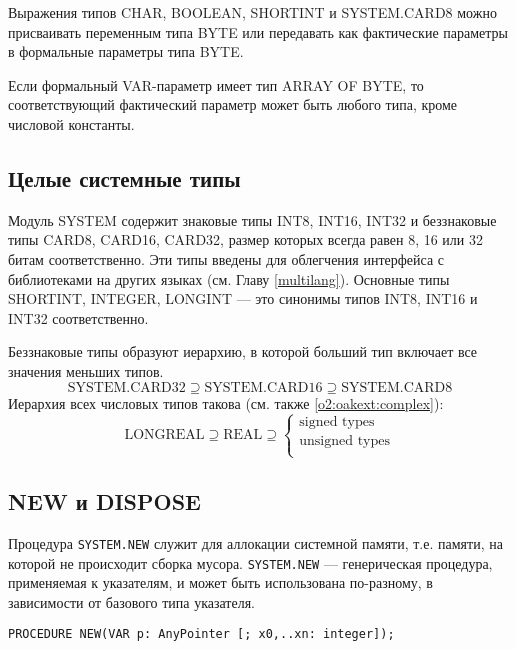 Выражения типов CHAR, BOOLEAN, SHORTINT и SYSTEM.CARD8 
можно присваивать переменным типа
BYTE или передавать как фактические параметры в формальные параметры типа
BYTE.

Если формальный VAR-параметр имеет тип ARRAY OF BYTE,
то соответствующий фактический параметр может быть любого типа,
кроме числовой константы.

\subsection{Целые системные типы}\label{o2:fixed:size}

Модуль SYSTEM содержит знаковые типы
INT8, INT16, INT32
и беззнаковые типы CARD8, CARD16, CARD32,
размер которых всегда равен
8, 16 или 32 битам соответственно. Эти типы введены для 
облегчения интерфейса с библиотеками на других языках
(см. Главу \ref{multilang}).
Основные типы SHORTINT, INTEGER, LONGINT
--- это синонимы типов INT8, INT16 и INT32 соответственно.

Беззнаковые типы образуют иерархию, в которой больший тип
включает все значения меньших типов.
$$
\mbox{SYSTEM.CARD32} \supseteq \mbox{SYSTEM.CARD16} \supseteq \mbox{SYSTEM.CARD8}
$$
Иерархия всех числовых типов такова (см. также \ref{o2:oakext:complex}):
$$
\mbox{LONGREAL} \supseteq \mbox{REAL} \supseteq
\left \{
  \begin{array}{l}
     \mbox{signed types}        \\
     \mbox{unsigned types}      \\
  \end{array}
\right .
$$

\subsection{NEW и DISPOSE}\label{o2:system:new}

Процедура {\tt SYSTEM.NEW} служит для аллокации системной памяти,
т.е. памяти, на которой не происходит сборка мусора.
{\tt SYSTEM.NEW} --- генерическая процедура, применяемая к указателям,
и может быть использована по-разному, в зависимости от базового типа 
указателя.

{\small
\begin{verbatim}
PROCEDURE NEW(VAR p: AnyPointer [; x0,..xn: integer]);
\end{verbatim}
}

